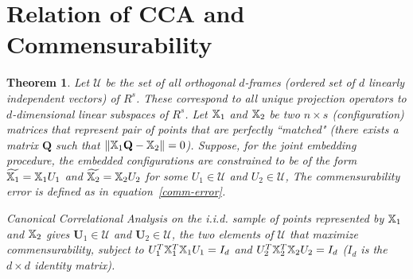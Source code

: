 \documentclass[12pt,oneside,final]{thesis}\usepackage[]{graphicx}\usepackage[]{color}
\newtheorem{thm}{Theorem}
\begin{document}
\section{Relation of CCA and Commensurability} 

\begin{thm}
Let $ \mathcal{U}$ be the set of all orthogonal $d$-frames 
(ordered set of $d$ linearly independent vectors) of $R^{s}$. These correspond to all unique projection operators to $d$-dimensional linear subspaces of  $R^{s}$.
Let $\mathbb{X}_1$ and $\mathbb{X}_2$ be two $n\times s$ (configuration) matrices that represent pair of points that are perfectly ``matched"
 (there exists a  matrix $\mathbf{Q}$ such that $\|   \mathbb{X}_1\mathbf{Q}  -\mathbb{X}_2 \|=0$).
 Suppose, for the joint embedding procedure, the embedded configurations are constrained to be of the form $\widetilde{\mathbb{X}_1}=\mathbb{X}_1U_1$ and $\widetilde{\mathbb{X}_2}=\mathbb{X}_2U_2$ for some  $U_1\in \mathcal{U}$ and $U_2\in  \mathcal{U}$,
The commensurability error is  defined as
in equation~\eqref{comm-error}.
 
 Canonical Correlational Analysis on the  \emph{i.i.d.} sample of points represented by  $\mathbb{X}_1$ and $\mathbb{X}_2$ gives $\mathbf{U}_1\in\mathcal{U}$ and  $\mathbf{U}_2\in\mathcal{U}$, 
 the two elements of $\mathcal{U}$ that maximize commensurability, subject to $U_1^{T}\mathbb{X}_1^{T}\mathbb{X}_1U_1=I_d$ and $U_2^{T}\mathbb{X}_2^{T}\mathbb{X}_2U_2=I_d$ ($I_d$ is the $d \times d$ identity matrix).
\end{thm}
\end{document}
